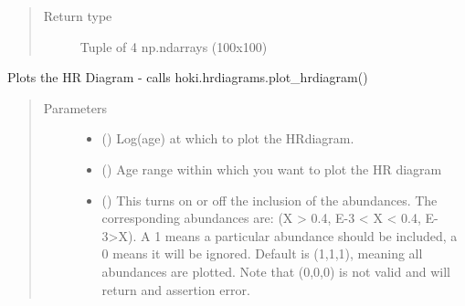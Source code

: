 \documentclass[letterpaper,10pt,english]{sphinxmanual}
\begin{document}
\begin{fulllineitems}
\begin{fulllineitems}
\begin{quote}
\begin{description}
\begin{itemize}
\end{itemize}


\item[{Return type}] \leavevmode
Tuple of 4 np.ndarrays (100x100)

\end{description}\end{quote}

\end{fulllineitems}


\begin{fulllineitems}
\label{\detokenize{hrdiagrams:hoki.hrdiagrams.HRDiagram.plot}}
Plots the HR Diagram - calls hoki.hrdiagrams.plot\_hrdiagram()
\begin{quote}\begin{description}
\item[{Parameters}] \leavevmode\begin{itemize}
\item {} 
 (\sphinxstyleliteralemphasis{\sphinxupquote{, }}) \textendash{} Log(age) at which to plot the HRdiagram.

\item {} 
 (\sphinxstyleliteralemphasis{\sphinxupquote{, }}) \textendash{} Age range within which you want to plot the HR diagram

\item {} 
 (\sphinxstyleliteralemphasis{\sphinxupquote{, }}\sphinxstyleliteralemphasis{\sphinxupquote{, }}) \textendash{} This turns on or off the inclusion of the abundances. The corresponding abundances are:
(X \textgreater{} 0.4, E-3 \textless{} X \textless{} 0.4, E-3\textgreater{}X). A 1 means a particular abundance should be included,
a 0 means it will be ignored. Default is (1,1,1), meaning all abundances are plotted.
Note that (0,0,0) is not valid and will return and assertion error.


\end{itemize}
\end{description}
\end{quote}
\end{fulllineitems}
\end{fulllineitems}
\end{document}
